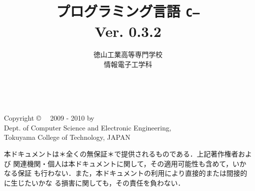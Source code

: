 \documentclass[11pt,a4j,twoside,dvipdfmx]{jbook}
\newcommand{\ver}{Ver. 0.3.2}
\newcommand{\cmm}{{\tt C--}}
\begin{document}
\setlength{\oddsidemargin}{10pt}
\setlength{\evensidemargin}{-10pt}
\setlength{\headsep}{1cm}

\title{プログラミング言語 \cmm \\\ver}
\author{徳山工業高等専門学校\\情報電子工学科}
\date{}

\maketitle

\thispagestyle{empty}
\onecolumn
~
\vfill
\begin{flushleft}
Copyright \copyright ~~ 2009 - 2010 by \\
Dept. of Computer Science and Electronic Engineering, \\
Tokuyama College of Technology, JAPAN
\end{flushleft}


\vspace{0.8cm}

本ドキュメントは＊全くの無保証＊で提供されるものである．上記著作権者および
関連機関・個人は本ドキュメントに関して，その適用可能性も含めて，いかなる保証
も行わない．また，本ドキュメントの利用により直接的または間接的に生じたいかな
る損害に関しても，その責任を負わない．
\setcounter{page}{0}

\newpage
{}
\tableofcontents

\onecolumn
~
\thispagestyle{empty}
\setcounter{page}{0}

\newpage
{}


\appendix

\pagestyle{empty}
\onecolumn
~
\end{document}
